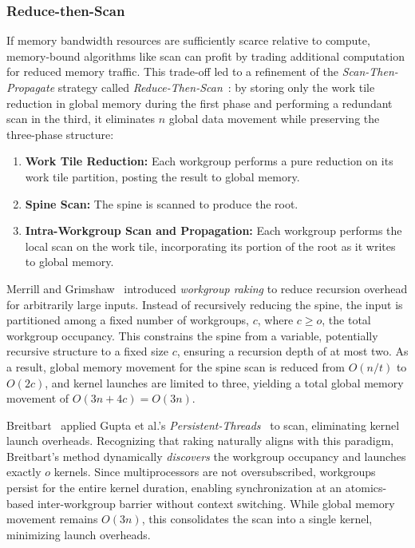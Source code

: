\documentclass[sigconf]{acmart}
\begin{document}
\subsubsection{Reduce-then-Scan}
If memory bandwidth resources are sufficiently scarce relative to compute, memory-bound algorithms like scan can profit by trading additional computation for reduced memory traffic. This trade-off led to a refinement of the \emph{Scan-Then-Propagate} strategy called \emph{Reduce-Then-Scan}~\cite{10.1145/1375527.1375559, Merrill2009, 10.1109/TPDS.2012.336, 10.5555/2031978.2032029}: by storing only the work tile reduction in global memory during the first phase and performing a redundant scan in the third, it eliminates $n$ global data movement while preserving the three-phase structure:
\begin{enumerate}
  \item \textbf{Work Tile Reduction:} Each workgroup performs a pure reduction on its work tile partition, posting the result to global memory.
  \item \textbf{Spine Scan:} The spine is scanned to produce the root.
  \item \textbf{Intra-Workgroup Scan and Propagation:} Each workgroup performs the local scan on the work tile, incorporating its portion of the root as it writes to global memory.
\end{enumerate}

Merrill and Grimshaw~\cite{Merrill2009} introduced \emph{workgroup raking} to reduce recursion overhead for arbitrarily large inputs. Instead of recursively reducing the spine, the input is partitioned among a fixed number of workgroups, $c$, where $c \geq o$, the total workgroup occupancy. This constrains the spine from a variable, potentially recursive structure to a fixed size $c$, ensuring a recursion depth of at most two. As a result, global memory movement for the spine scan is reduced from $O(n/t)$ to $O(2c)$, and kernel launches are limited to three, yielding a total global memory movement of $O(3n + 4c) = O(3n)$.

Breitbart~\cite{10.5555/2031978.2032029} applied Gupta et al.'s \emph{Persistent-Threads}~\cite{gupta2012} to scan, eliminating kernel launch overheads. Recognizing that raking naturally aligns with this paradigm, Breitbart's method dynamically \emph{discovers} the workgroup occupancy and launches exactly $o$ kernels. Since multiprocessors are not oversubscribed, workgroups persist for the entire kernel duration, enabling synchronization at an atomics-based inter-workgroup barrier without context switching. While global memory movement remains $O(3n)$, this consolidates the scan into a single kernel, minimizing launch overheads.
\end{document}
